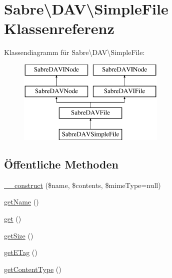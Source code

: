 \hypertarget{class_sabre_1_1_d_a_v_1_1_simple_file}{}\section{Sabre\textbackslash{}D\+AV\textbackslash{}Simple\+File Klassenreferenz}
\label{class_sabre_1_1_d_a_v_1_1_simple_file}
Klassendiagramm für Sabre\textbackslash{}D\+AV\textbackslash{}Simple\+File\+:\begin{figure}[H]
\begin{center}
\leavevmode
\includegraphics[height=4.000000cm]{class_sabre_1_1_d_a_v_1_1_simple_file}
\end{center}
\end{figure}
\subsection*{Öffentliche Methoden}
\begin{DoxyCompactItemize}
\item 
\mbox{\hyperlink{class_sabre_1_1_d_a_v_1_1_simple_file_a3111b71269992632d6ef977c9167ddf3}{\+\_\+\+\_\+construct}} (\$name, \$contents, \$mime\+Type=null)
\item 
\mbox{\hyperlink{class_sabre_1_1_d_a_v_1_1_simple_file_a57c28fd3a5bd1437a816030ba46111b6}{get\+Name}} ()
\item 
\mbox{\hyperlink{class_sabre_1_1_d_a_v_1_1_simple_file_afe23fefcf079b4fe34f2e612be324e3b}{get}} ()
\item 
\mbox{\hyperlink{class_sabre_1_1_d_a_v_1_1_simple_file_a1fa9715d7dda56738289e186923dd2b1}{get\+Size}} ()
\item 
\mbox{\hyperlink{class_sabre_1_1_d_a_v_1_1_simple_file_ac6706a1b6c9d029f253c6df2b6616f11}{get\+E\+Tag}} ()
\item 
\mbox{\hyperlink{class_sabre_1_1_d_a_v_1_1_simple_file_af7db06a30e0b3557c488d2608a2c0523}{get\+Content\+Type}} ()
\end{DoxyCompactItemize}
